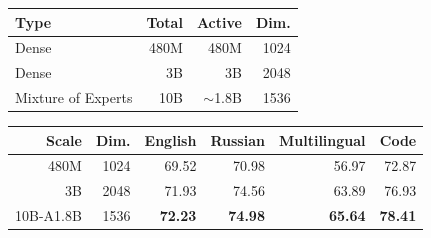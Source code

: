 \documentclass[11pt]{article}
\begin{document}
\begin{table}[!t]
  \centering
  \begin{minipage}[t]{0.35\textwidth}
    \vspace{0pt}
    \label{tab:architecture}
    \centering
    \small
    \setlength{\tabcolsep}{3.2pt}
    \begin{tabular}{lrrr}
      \toprule
      \textbf{Type} & \textbf{Total} & \textbf{Active} & \textbf{Dim.} \\
      \midrule
      Dense      & 480M & 480M & 1024 \\
      Dense      & 3B & 3B & 2048 \\
      Mixture of Experts & 10B & $\sim$1.8B & 1536 \\
      \bottomrule
    \end{tabular}
  \end{minipage}
  \hfill
  \begin{minipage}[t]{0.62\textwidth}
    \vspace{0pt}
    \label{tab:main}
    \centering
    \small
    \setlength{\tabcolsep}{3.5pt}
    \begin{tabular}{rrrrrr}
      \toprule
      \textbf{Scale} & \textbf{Dim.} & \textbf{English} & \textbf{Russian} & \textbf{Multilingual} & \textbf{Code} \\
      \midrule
      480M       & 1024 & 69.52 & 70.98 & 56.97 & 72.87 \\
      3B         & 2048 & 71.93 & 74.56 & 63.89 & 76.93 \\
      10B-A1.8B  & 1536 & \textbf{72.23} & \textbf{74.98} & \textbf{65.64} & \textbf{78.41} \\
      \bottomrule
    \end{tabular}
  \end{minipage}
\end{table}
\end{document}
